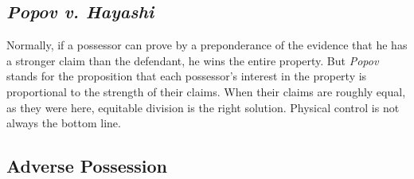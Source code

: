 \subsection{\emph{Popov v. Hayashi}} 

Normally, if a possessor can prove by a preponderance of the evidence that he 
has a stronger claim than the defendant, he wins the entire property. But 
\emph{Popov} stands for the proposition that each possessor's interest in the 
property is proportional to the strength of their claims. When their claims are 
roughly equal, as they were here, equitable division is the right solution. 
Physical control is not always the bottom line.


\subsection{Adverse Possession}

